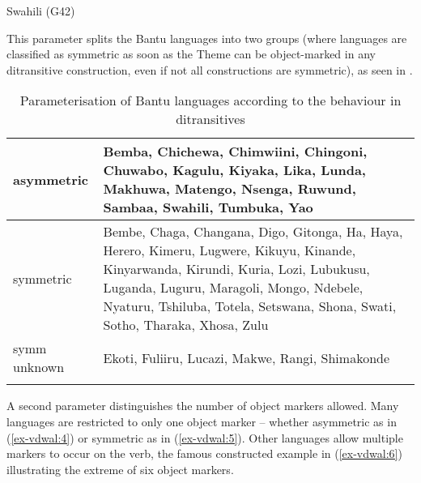 \documentclass[output=paper
,modfonts
,nonflat]{langsci/langscibook}
\begin{document}
\begin{exe}
\ex Swahili (G42) \label{ex-vdwal:3}
	\xlist
	\endxlist
\end{exe}
This parameter splits the Bantu languages into two groups (where languages are classified as symmetric as soon as the Theme can be object-marked in any ditransitive construction, even if not all constructions are symmetric), as seen in .

\begin{table}[hb]
\caption{Parameterisation of Bantu languages according to the behaviour in ditransitives}
\label{Table 1}	
	\begin{tabularx}{\textwidth}{lX}
	\lsptoprule
	asymmetric & Bemba, Chichewa, Chimwiini, Chingoni, Chuwabo, Kagulu, Kiyaka,
	Lika, Lunda, Makhuwa, Matengo, Nsenga, Ruwund, Sambaa, Swahili, Tumbuka, Yao\\ 
	\midrule
	symmetric & Bembe, Chaga, Changana, Digo, Gitonga, Ha, Haya, Herero, Kimeru, Lugwere, Kikuyu, Kinande, Kinyarwanda, Kirundi, Kuria, Lozi, Lubukusu, Luganda, Luguru, Maragoli, Mongo, Ndebele, Nyaturu, Tshiluba, Totela, Setswana, Shona, Swati, Sotho, Tharaka, Xhosa, Zulu\\ 
	\midrule
	symm unknown & Ekoti, Fuliiru, Lucazi, Makwe, Rangi, Shimakonde\\
	\lspbottomrule
	\end{tabularx}
\end{table}

\hspace*{-0.7202pt}A second parameter distinguishes the number of object markers allowed. Many languages are restricted to only one object marker -- whether asymmetric as in (\ref{ex-vdwal:4}) or symmetric as in (\ref{ex-vdwal:5}). Other languages allow multiple markers to occur on the verb, the famous constructed example in (\ref{ex-vdwal:6}) illustrating the extreme of six object markers.
\end{document}
